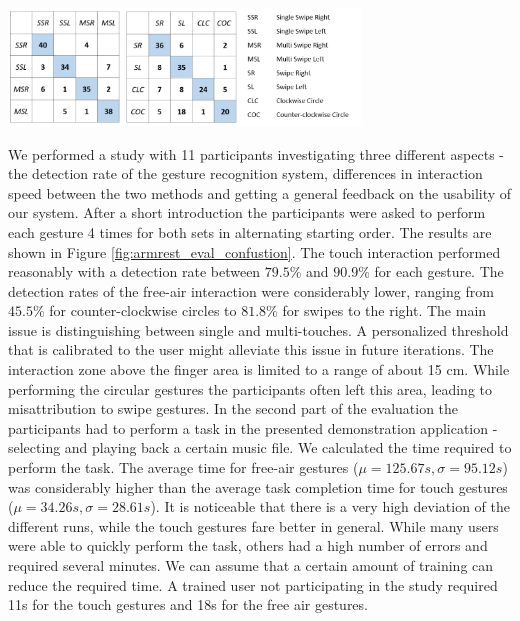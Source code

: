 \begin{minipage}{\linewidth}
\centering
\includegraphics[width=0.7\textwidth]{images/armrest_eval_confustion}
\label{fig:armrest_eval_confustion}
\end{minipage}

We performed a study with 11 participants investigating three different aspects - the detection rate of the gesture recognition system, differences in interaction speed between the two methods and getting a general feedback on the usability of our system. After a short introduction the participants were asked to perform each gesture 4 times for both sets in alternating starting order. The results are shown in Figure \ref{fig:armrest_eval_confustion}. The touch interaction performed reasonably with a detection rate between $79.5\%$ and $90.9\%$ for each gesture. The detection rates of the free-air interaction were considerably lower, ranging from $45.5\%$ for counter-clockwise circles to $81.8\%$ for swipes to the right. The main issue is distinguishing between single and multi-touches. A personalized threshold that is calibrated to the user might alleviate this issue in future iterations. The interaction zone above the finger area is limited to a range of about 15 cm. While performing the circular gestures the participants often left this area, leading to misattribution to swipe gestures.
In the second part of the evaluation the participants had to perform a task in the presented demonstration application - selecting and playing back a certain music file. We calculated the time required to perform the task. The average time for free-air gestures ($\mu=125.67s, \sigma=95.12s$) was considerably higher than the average task completion time for touch gestures ($\mu=34.26s, \sigma=28.61s$). It is noticeable that there is a very high deviation of the different runs, while the touch gestures fare better in general. While many users were able to quickly perform the task, others had a high number of errors and required several minutes. We can assume that a certain amount of training can reduce the required time. A trained user not participating in the study required 11s for the touch gestures and 18s for the free air gestures.
